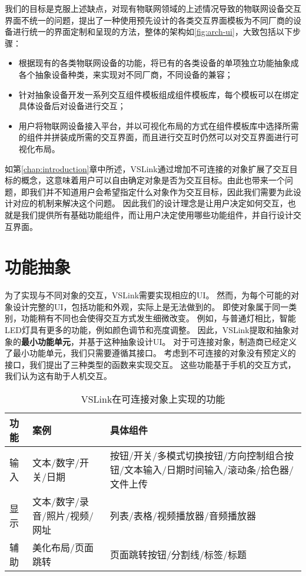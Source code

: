 我们的目标是克服上述缺点，对现有物联网领域的上述情况导致的物联网设备交互界面不统一的问题，提出了一种使用预先设计的各类交互界面模板为不同厂商的设备进行统一的界面定制和呈现的方法，整体的架构如\autoref{fig:arch-ui}，大致包括以下步骤：

\begin{itemize}
	\item 根据现有的各类物联网设备的功能，将已有的各类设备的单项独立功能抽象成各个抽象设备种类，来实现对不同厂商，不同设备的兼容；
	\item 针对抽象设备开发一系列交互组件模板组成组件模板库，每个模板可以在绑定具体设备后对设备进行交互；
	\item 用户将物联网设备接入平台，并以可视化布局的方式在组件模板库中选择所需的组件并拼装成所需的交互界面，而且进行交互时仍然可以对交互界面进行可视化布局。
\end{itemize}

如第\ref{chap:introduction}章中所述，VSLink通过增加不可连接的对象扩展了交互目标的概念，这意味着用户可以自由确定对象是否为交互目标。由此也带来一个问题，即我们并不知道用户会希望指定什么对象作为交互目标，因此我们需要为此设计对应的机制来解决这个问题。
因此我们的设计理念是让用户决定如何交互，也就是我们提供所有基础功能组件，而让用户决定使用哪些功能组件，并自行设计交互界面。

\section{功能抽象}
为了实现与不同对象的交互，VSLink需要实现相应的UI。
然而，为每个可能的对象设计完整的UI，包括功能和外观，实际上是无法做到的。
即使对象属于同一类别，功能稍有不同也会使得交互方式发生细微改变。
例如，与普通灯相比，智能LED灯具有更多的功能，例如颜色调节和亮度调整。
因此，VSLink提取和抽象对象的\textbf{最小功能单元}，并基于这种抽象设计UI。
对于可连接对象，制造商已经定义了最小功能单元，我们只需要遵循其接口。
考虑到不可连接的对象没有预定义的接口，我们提出了三种类型的函数来实现交互。
这些功能基于手机的交互方式，我们认为这有助于人机交互。

\begin{table}[htbp]
	\caption{VSLink在可连接对象上实现的功能}  \label{table:functions_2} 
	\begin{center}  
		\begin{tabular}{|m{1cm}<{\centering}|m{6cm}<{\centering}|m{8cm}<{\centering}|}  
			\hline  
			\textbf{功能} & \textbf{案例} &\textbf{具体组件}\\ \hline  
			输入 & 文本/数字/开关/日期 & 按钮/开关/多模式切换按钮/方向控制组合按钮/文本输入/日期时间输入/滚动条/拾色器/文件上传 \\ \hline 
			显示 & 文本/数字/录音/照片/视频/网址 & 列表/表格/视频播放器/音频播放器  \\ \hline
			辅助 & 美化布局/页面跳转 & 页面跳转按钮/分割线/标签/标题 \\ \hline
		\end{tabular}  
	\end{center}  
\end{table}

